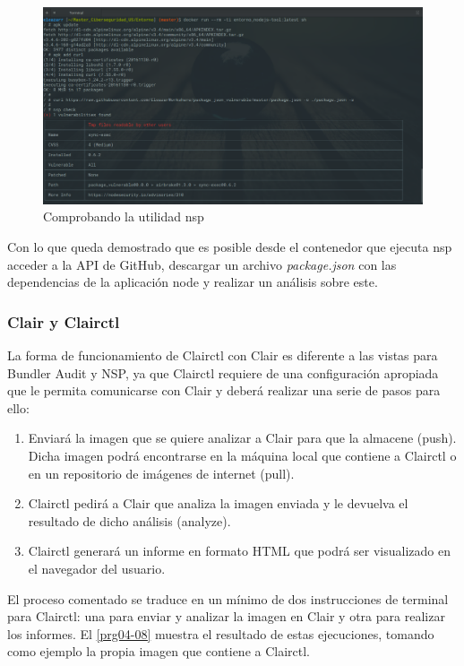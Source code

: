 \begin{figure}[htbp]
	\centering
	\includegraphics[width=1.0\linewidth]
	{desarrollo/figuras/nsp.png}
	\caption{Comprobando la utilidad nsp}
	\label{nsp}
\end{figure}

Con lo que queda demostrado que es posible desde el contenedor que ejecuta nsp acceder a la \gls{API} de GitHub, descargar un archivo \textit{package.json} con las dependencias de la aplicación node y realizar un análisis sobre este.

\subsubsection{Clair y Clairctl}

La forma de funcionamiento de Clairctl con Clair es diferente a las vistas para Bundler Audit y NSP, ya que Clairctl requiere de una configuración apropiada que le permita comunicarse con Clair y deberá realizar una serie de pasos para ello:

\begin{enumerate}
	\item Enviará la imagen que se quiere analizar a Clair para que la almacene (push). Dicha imagen podrá encontrarse en la máquina local que contiene a Clairctl o en un repositorio de imágenes de internet (pull).
	\item Clairctl pedirá a Clair que analiza la imagen enviada y le devuelva el resultado de dicho análisis (analyze).
	\item Clairctl generará un informe en formato HTML que podrá ser visualizado en el navegador del usuario.
\end{enumerate}

El proceso comentado se traduce en un mínimo de dos instrucciones de terminal para Clairctl: una para enviar y analizar la imagen en Clair y otra para realizar los informes. El \autoref{prg04-08} muestra el resultado de estas ejecuciones, tomando como ejemplo la propia imagen que contiene a Clairctl.

